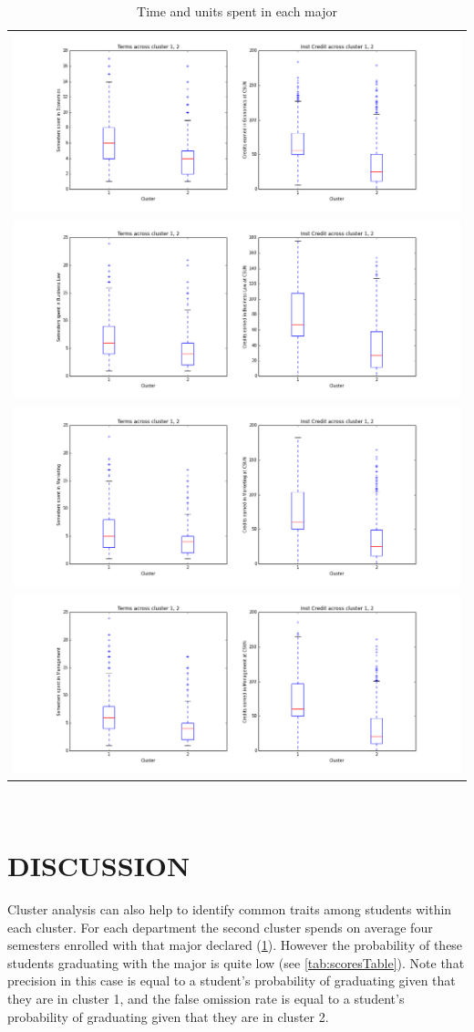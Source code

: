 \documentclass{sigchi}
\begin{document}
\begin{table}[ht]
 \begin{center}
   \begin{tabular}{ c }
   \hline
   \includegraphics[width=0.4\columnwidth]{figures/box-Economics.png}
   \\
   \includegraphics[width=0.4\columnwidth]{figures/box-Business-Law.png}
   \\
   \hline
   \includegraphics[width=0.4\columnwidth]{figures/box-marketing.png}
	\\  
   \includegraphics[width=0.4\columnwidth]{figures/box-management.png}
   \\
   \hline
   \end{tabular}
 \end{center}
  \caption{Time and units spent in each major}~\label{tab:boxplotTable}
\end{table}

\section{DISCUSSION}

Cluster analysis can also help to identify common traits among students within each cluster. For each department the second cluster spends on average four semesters enrolled with that major declared (\ref{tab:boxplotTable}). However the probability of these students graduating with the major is quite low (see \ref{tab:scoresTable}).
Note that precision in this case is equal to a student’s probability of graduating given that they are in cluster 1, and the false omission rate is equal to a student’s probability of graduating given that they are in cluster 2.
\end{document}
